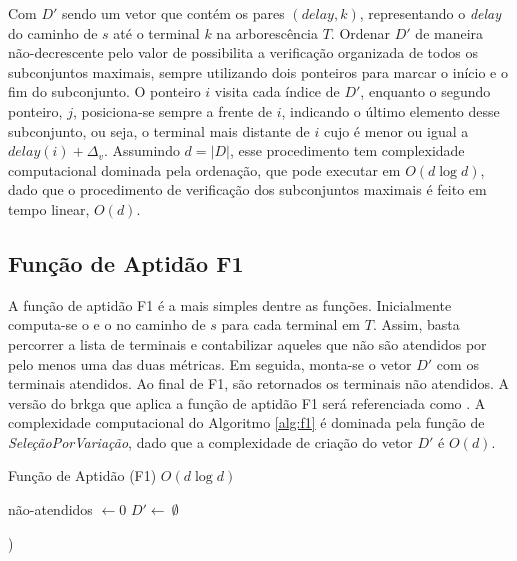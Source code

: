 Com $D'$ sendo um  vetor que contém os pares $(delay,  k)$, representando o {\em
delay} do caminho de  $s$ até o terminal $k$ na  arborescência $T$. Ordenar $D'$
de  maneira não-decrescente  pelo valor  de {\delay}  possibilita a  verificação
organizada de todos  os subconjuntos maximais, sempre  utilizando dois ponteiros
para marcar o início  e o fim do subconjunto. O ponteiro  $i$ visita cada índice
de $D'$, enquanto o segundo ponteiro,  $j$, posiciona-se sempre a frente de $i$,
indicando o último elemento desse subconjunto, ou seja, o terminal mais distante
de $i$ cujo  {\delay} é menor ou  igual a $delay(i) + \Delta_v$.  Assumindo $d =
|D|$, esse procedimento tem  complexidade computacional dominada pela ordenação,
que pode executar em  $O(d \log d)$, dado que o  procedimento de verificação dos
subconjuntos maximais é feito em tempo linear, $O(d)$.

\subsection{Função de Aptidão F1} \label{subsec:brkga-f1}

A  função  de aptidão  F1  é  a mais  simples  dentre  as funções.  Inicialmente
computa-se o {\delay} e o {\jitter} no caminho de $s$ para cada terminal em $T$.
Assim, basta percorrer  a lista de terminais e contabilizar  aqueles que não são
atendidos por  pelo menos uma  das duas métricas.  Em seguida, monta-se  o vetor
$D'$ com os terminais atendidos. Ao final de F1, são retornados os terminais não
atendidos.  A versão  do \gls{brkga}  que  aplica a  função de  aptidão F1  será
referenciada   como  {\bfum}.   A   complexidade   computacional  do   Algoritmo
\ref{alg:f1}  é dominada  pela função  de {\em  SeleçãoPorVariação}, dado  que a
complexidade de criação do vetor $D'$ é $O(d)$.

\begin{algorithm}[!ht]
  \caption{Função de Aptidão (F1) $O(d \log d)$ \label{alg:f1}}

  não-atendidos $\leftarrow 0$\;
  $D' \leftarrow \ \emptyset$

  
  )\;
\end{algorithm}

